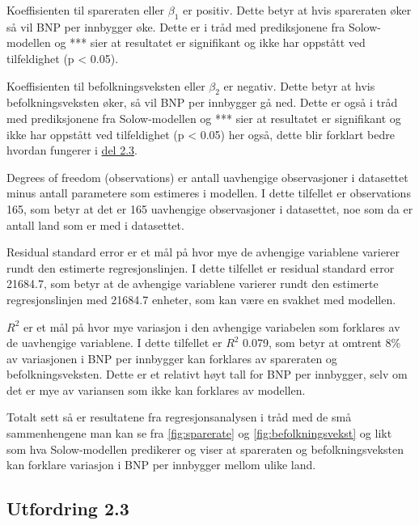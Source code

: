 \documentclass[
  12pt,
  a4paper,
  DIV=11,
  numbers=noendperiod]{scrartcl}
\begin{document}
Koeffisienten til spareraten eller \(\beta_1\) er positiv. Dette betyr
at hvis spareraten øker så vil BNP per innbygger øke. Dette er i tråd
med prediksjonene fra Solow-modellen og *** sier at resultatet er
signifikant og ikke har oppstått ved tilfeldighet (p \textless{} 0.05).

Koeffisienten til befolkningsveksten eller \(\beta_2\) er negativ. Dette
betyr at hvis befolkningsveksten øker, så vil BNP per innbygger gå ned.
Dette er også i tråd med prediksjonene fra Solow-modellen og *** sier at
resultatet er signifikant og ikke har oppstått ved tilfeldighet (p
\textless{} 0.05) her også, dette blir forklart bedre hvordan fungerer i
\hyperref[c.-tolke-resultatene-fra-spredningsdiagrammene-og-regresjonsanalysen-og-diskutere-eventuelle-svakheter-eller-begrensninger.]{del 2.3}.

Degrees of freedom (observations) er antall uavhengige observasjoner i
datasettet minus antall parametere som estimeres i modellen. I dette
tilfellet er observations 165, som betyr at det er 165 uavhengige
observasjoner i datasettet, noe som da er antall land som er med i
datasettet.

Residual standard error er et mål på hvor mye de avhengige variablene
varierer rundt den estimerte regresjonslinjen. I dette tilfellet er
residual standard error 21684.7, som betyr at de avhengige variablene
varierer rundt den estimerte regresjonslinjen med 21684.7 enheter, som
kan være en svakhet med modellen.

\(R^2\) er et mål på hvor mye variasjon i den avhengige variabelen som
forklares av de uavhengige variablene. I dette tilfellet er \(R^2\)
0.079, som betyr at omtrent 8\% av variasjonen i BNP per innbygger kan
forklares av spareraten og befolkningsveksten. Dette er et relativt høyt
tall for BNP per innbygger, selv om det er mye av variansen som ikke kan
forklares av modellen.

Totalt sett så er resultatene fra regresjonsanalysen i tråd med de små
sammenhengene man kan se fra \autoref{fig:sparerate} og
\autoref{fig:befolkningsvekst} og likt som hva Solow-modellen predikerer
og viser at spareraten og befolkningsveksten kan forklare variasjon i
BNP per innbygger mellom ulike land.

\clearpage

\subsection{Utfordring 2.3}\label{utfordring-2.3}
\end{document}
